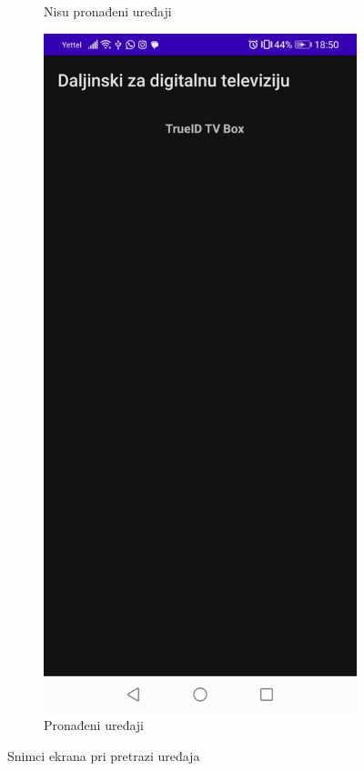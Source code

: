 \documentclass[implementacija.tex]{subfiles}
\begin{document}
\begin{figure}
\begin{subfigure}[b]{0.3\textwidth}
         \caption{Nisu pronađeni uređaji}
        \label{fig:nema_uredjaja}
    \end{subfigure}
    \hfill
    \begin{subfigure}[b]{0.3\textwidth}
        \centering
        \includegraphics[width=\textwidth,keepaspectratio]{Implementacija/snimci_ekrana/5_pronadjeni_uredjaji.jpg}
         \caption{Pronađeni uređaji}
        \label{fig:pronadjeni_uredjaji}
    \end{subfigure}
    \caption{Snimci ekrana pri pretrazi uređaja}
    \label{fig:obavestenja}
\end{figure}
\end{document}
